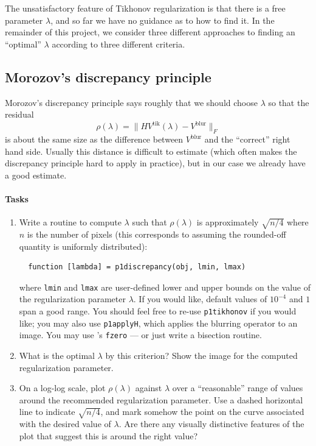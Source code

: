 \documentclass[12pt, leqno]{article} %
\begin{document}
The unsatisfactory feature of Tikhonov regularization is that there
is a free parameter $\lambda$, and so far we have no guidance as to
how to find it.  In the remainder of this project, we consider three
different approaches to finding an ``optimal'' $\lambda$ according
to three different criteria.

\subsection{Morozov's discrepancy principle}

Morozov's discrepancy
principle says roughly that we should choose $\lambda$ so that the
residual
\[
  \rho(\lambda) = \|HV^{\mathrm{tik}}(\lambda) - V^{\mathrm{blur}}\|_F
\]
is about the same size as the difference between $V^{\mathrm{blur}}$
and the ``correct'' right hand side.  Usually this distance is difficult
to estimate (which often makes the discrepancy principle hard to apply
in practice), but in our case we already have a good estimate.

\paragraph*{Tasks}
\begin{enumerate}
\item
  Write a routine to compute $\lambda$ such
  that $\rho(\lambda)$ is approximately $\sqrt{n/4}$ where $n$
  is the number of pixels (this corresponds to assuming the
  rounded-off quantity is uniformly distributed):
  \begin{lstlisting}
  function [lambda] = p1discrepancy(obj, lmin, lmax)
  \end{lstlisting}
  where {\tt lmin} and {\tt lmax} are user-defined lower and upper
  bounds on the value of the regularization parameter $\lambda$.
  If you would like, default values of $10^{-4}$ and $1$ span a good
  range.
  You should feel free to re-use {\tt p1tikhonov} if you would like;
  you may also use {\tt p1applyH}, which applies the blurring operator
  to an image.  You may use \matlab's {\tt fzero} --- or just write a
  bisection routine.
\item
  What is the optimal $\lambda$ by this criterion?
  Show the image for the computed regularization parameter.
\item
  On a log-log scale, plot $\rho(\lambda)$ against $\lambda$ over
  a ``reasonable'' range of values around the recommended
  regularization parameter.  Use a dashed horizontal line to indicate
  $\sqrt{n/4}$, and mark somehow the point on the
  curve associated with the desired value of $\lambda$.  Are there any
  visually distinctive features of the plot that suggest this is
  around the right value?
\end{enumerate}
\end{document}
